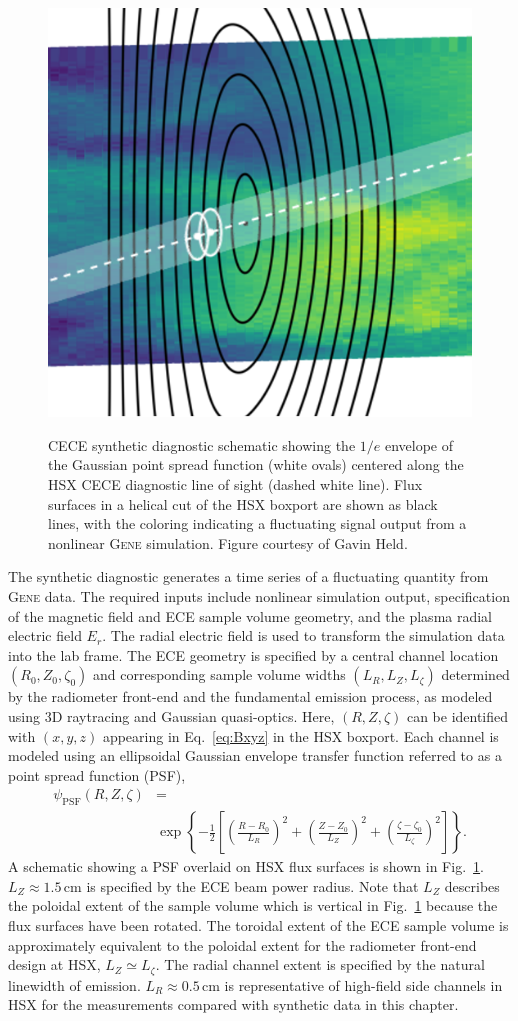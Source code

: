 \documentclass[%
 aip,
 amsmath,amssymb,
 reprint,%
]{revtex4-1}
\newcommand{\gene}[1]{\rmfamily\textsc{Gene}#1}
\begin{document}
\begin{figure}[!htbp]
  \centering
  {\includegraphics[width=.45\textwidth]{Figures/very_cropped_cece_overlay_fig.png}}
\hfill

\caption{CECE synthetic diagnostic schematic showing the $1/e$ envelope of the Gaussian point spread function (white ovals) centered along the HSX CECE diagnostic line of sight (dashed white line). Flux surfaces in a helical cut of the HSX boxport are shown as black lines, with the coloring indicating a fluctuating signal output from a nonlinear \gene{} simulation. Figure courtesy of Gavin Held.}
  \label{fig:emiss_to_synth_chans}
\end{figure}

The synthetic diagnostic generates a time series of a fluctuating quantity from \gene{} data. The required inputs include nonlinear simulation output, specification of the magnetic field and ECE sample volume geometry, and the plasma radial electric field $E_r$. The radial electric field is used to transform the simulation data into the lab frame. The ECE geometry is specified by a central channel location $(R_0,Z_0,\zeta_0)$ and corresponding sample volume widths $(L_R,L_Z,L_\zeta)$ determined by the radiometer front-end and the fundamental emission process, as modeled using 3D raytracing and Gaussian quasi-optics. Here, $(R,Z,\zeta)$ can be identified with $(x,y,z)$ appearing in Eq.\ \eqref{eq:Bxyz} in the HSX boxport. Each channel is modeled using an ellipsoidal Gaussian envelope transfer function referred to as a point spread function (PSF),
\begin{align}
	\psi_{\mathrm{PSF}}(R,Z,\zeta) &= \\ &{}\exp\left\{ - \frac{1}{2} \left[ \left(\frac{R-R_0}{L_R}\right)^2 + \left(\frac{Z-Z_0}{L_Z}\right)^2 + \left(\frac{\zeta-
	\zeta_0}{L_\zeta}\right)^2 \right] \right\}. \label{eq:psf}
\end{align}
A schematic showing a PSF overlaid on HSX flux surfaces is shown in Fig.\ \ref{fig:emiss_to_synth_chans}. $L_Z \approx 1.5$\,cm is specified by the ECE beam power radius. Note that $L_Z$ describes the poloidal extent of the sample volume which is vertical in Fig.\ \ref{fig:emiss_to_synth_chans} because the flux surfaces have been rotated. The toroidal extent of the ECE sample volume is approximately equivalent to the poloidal extent for the radiometer front-end design at HSX, $L_Z\simeq L_\zeta$. The radial channel extent is specified by the natural linewidth of emission. $L_R\approx 0.5$\,cm is representative of high-field side channels in HSX for the measurements compared with synthetic data in this chapter.  
\end{document}
